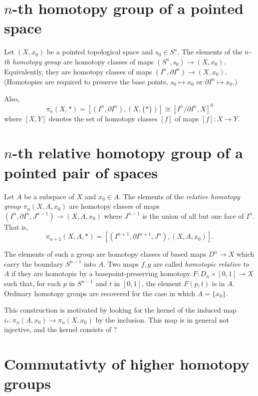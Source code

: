 \section{\texorpdfstring{$n$}{n}-th homotopy
group of a pointed space}
\label{section-n-th-homot-group-point-spac}

\begin{definition}
\label{definition-homotopy-group}
Let $(X,x_0)$ be a pointed topological space
and $s_0\in S^n$. The elements of
the {\it $n$-th homotopy group} are homotopy
classes of maps
$(S^n,s_0)\to (X,x_0)$. Equivalently, they
are homotopy classes of maps
$(I^n,\partial I^n)\to (X,x_0)$. (Homotopies
are required to preserve the base
points, $s_0\mapsto x_0$ or $\partial
I^n\mapsto x_0$.)

Also,
$$
\pi_n(X,*)=[(I^n,\partial
I^n),(X,\{*\})]\cong[I^n/\partial I^n,X]^0
$$
where $[X,Y]$ denotes the set of homotopy
classes $[f]$ of maps $[f]:X\to Y$.
\end{definition}

\section{\texorpdfstring{$n$}{n}-th relative
homotopy group of
a pointed pair of spaces}
\label{section-relative-homotopy-group}

\noindent
Let $A$ be a subspace of $X$ and $x_0\in A$.
The elements of the {\it relative homotopy
group $\pi_n(X,A,x_0)$}
are homotopy classes of maps $(I^n,\partial
I^n,J^{n-1})\to (X,A,x_0)$
where $J^{n-1}$ is the union of all but one
face of $I^n$.
That is,
$$
\pi_{n+1}(X,A,*)=[(I^{n+1},\partial
I^{n+1},J^n),(X,A,x_0)].
$$

The elements of such a group are homotopy
classes of based maps
$D^n\to X$ which carry the boundary $S^{n-1}$
into $A$.
Two maps $f,g$ are called {\it homotopic
relative to $A$}
if they are homotopic by a
basepoint-preserving homotopy
 $F:D_n\times[0,1]\to X$ such that, for each
 $p$ in $S^{n-1}$ and $t$ in $[0,1]$,
the element $F(p,t)$ is in $A$. Ordinary
homotopy groups are
recovered for the case in which $A=\{x_0\}$.

\begin{remark}
\label{remark-relative-homotopy}
This construction is motivated by
looking for the kernel of the
induced map $i_*:\pi_n(A,x_0)\to\pi_n(X,x_0)$
by the inclusion.
This map is in general not injective,
and the kernel consists of ?
\end{remark}

\section{Commutativty of higher homotopy
groups}
\label{section-commu-highe-homot-group}

